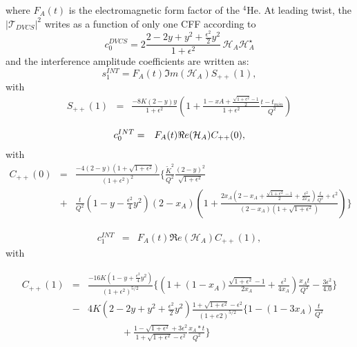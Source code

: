\normalsize
where $F_A(t)$ is the electromagnetic form factor of the $^4$He. At leading twist, the $|\mathcal{T}_{DVCS}|^{2}$ writes as a function of only one CFF according to
\small
\begin{equation}
   c_0^{DVCS}= 2 \frac{2-2y+y^2 + \frac{\epsilon^2}{2}y^2}{1 + \epsilon^2} \, 
   {\mathcal H}_A {\mathcal H}^{\star}_A 
   \label{eq:c0DVCS}
\end{equation}
\normalsize
and the interference amplitude coefficients are written as:
\small
\begin{equation}
s_{1}^{INT} = F_{A}(t) \Im m(\mathcal{H}_{A}) S_{++}(1),
\end{equation}
with
\begin{eqnarray}
   S_{++}(1) &=& \frac{-8K(2-y)y}{1+\epsilon^2} \left( 1 + 
\frac{1-xA+\frac{\sqrt{1+\epsilon^2}-1}{2}}{1+\epsilon^2} 
\frac{t-t_{min}}{Q^{2}} \right) \label{eq:s1I}
\end{eqnarray}



\begin{eqnarray}
\small
c_0^{INT} &=& F_A(t) \Re e(\mathcal{H}_{A}) C_{++}(0),
\end{eqnarray}
with \begin{eqnarray}  C_{++}(0) &=&
\frac{-4(2-y)(1+\sqrt{1+\epsilon^{2}})}{(1+\epsilon^{2})^2}  \bigg\{ 
   \frac{\widetilde{K}^2}{Q^2}  \frac{(2-y)^2}{\sqrt{1+\epsilon^{2}}} \, \\
   &+& \frac{t}{Q^2}  \left( 1 - y - \frac{\epsilon^2}{4} y^2 \right)  
(2-x_{A}) \left(  1 + \frac{2x_A(2-x_A + \frac{\sqrt{1+\epsilon^{2}}-1}{2} + 
\frac{\epsilon^{2}}{2x_A})\frac{t}{Q^2} + \epsilon^{2}}{(2-x_A) 
(1+\sqrt{1+\epsilon^{2}})}  \right)  \bigg\} \nonumber
 \label{eq:c0I} 
 \end{eqnarray}

\begin{eqnarray}
   c_1^{INT} &=&  F_A(t) \Re e(\mathcal{H}_{A}) C_{++}(1),
\end{eqnarray}
with  
   
   \begin{eqnarray}
   C_{++}(1) &=&
   \frac{-16K(1-y+\frac{\epsilon^{2}}{4}y^2)}{(1+\epsilon^{2})^{5/2}}\bigg\{\left(1+(1-x_A)\frac{\sqrt{1+\epsilon^{2}}-1}{2x_A} 
   + \frac{\epsilon^{2}}{4x_A}\right) 
\frac{x_At}{Q^2}-\frac{3\epsilon^{2}}{4.0} \bigg\} \nonumber \\&-& 4K \left( 
2-2y+y^2+\frac{\epsilon^{2}}{2}y^2\right)\frac{1+\sqrt{1+\epsilon^{2}}-\epsilon^{2}}{(1+e2)^{5/2}}\bigg\{1-(1-3x_A)\frac{t}{Q^2}\nonumber\\&\,\,\,\,&\,\,\,\,\,\,\,\,\,\,\,\,\,\,\,\,\,\,\,\,\,+\frac{1-\sqrt{1+\epsilon^{2}}+3\epsilon^{2}}{1+\sqrt{1+\epsilon^{2}}-\epsilon^{2}} 
\frac{x_A*t}{Q^2}\bigg\} \label{eq:c1I}
\end{eqnarray}


